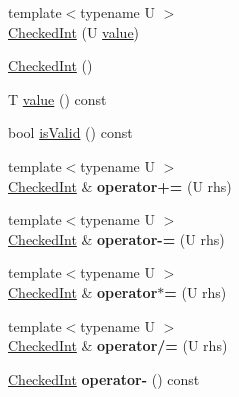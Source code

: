 \begin{DoxyCompactItemize}
\item 
{\footnotesize template$<$typename U $>$ }\\\hyperlink{classmozilla_1_1_checked_int_a5ef492c2db102e1e909e9a0fa2c51e07}{Checked\-Int} (U \hyperlink{classmozilla_1_1_checked_int_a8b36b4a1c385abb43884bcb430fef088}{value})
\item 
\hyperlink{classmozilla_1_1_checked_int_a4335815f498c3974ee7c223b2c6ee653}{Checked\-Int} ()
\item 
T \hyperlink{classmozilla_1_1_checked_int_a8b36b4a1c385abb43884bcb430fef088}{value} () const 
\item 
bool \hyperlink{classmozilla_1_1_checked_int_aa875473e559646998e2cb4f0f54aedc3}{is\-Valid} () const 
\item 
\hypertarget{classmozilla_1_1_checked_int_a36f745b635b95b5b3bb222469b0ef634}{{\footnotesize template$<$typename U $>$ }\\\hyperlink{classmozilla_1_1_checked_int}{Checked\-Int} \& {\bfseries operator+=} (U rhs)}\label{classmozilla_1_1_checked_int_a36f745b635b95b5b3bb222469b0ef634}

\item 
\hypertarget{classmozilla_1_1_checked_int_a6f4c078a17615065226c979bc6e3fd3a}{{\footnotesize template$<$typename U $>$ }\\\hyperlink{classmozilla_1_1_checked_int}{Checked\-Int} \& {\bfseries operator-\/=} (U rhs)}\label{classmozilla_1_1_checked_int_a6f4c078a17615065226c979bc6e3fd3a}

\item 
\hypertarget{classmozilla_1_1_checked_int_a58b43b6cddc26978a9c25f41a1d61a3e}{{\footnotesize template$<$typename U $>$ }\\\hyperlink{classmozilla_1_1_checked_int}{Checked\-Int} \& {\bfseries operator$\ast$=} (U rhs)}\label{classmozilla_1_1_checked_int_a58b43b6cddc26978a9c25f41a1d61a3e}

\item 
\hypertarget{classmozilla_1_1_checked_int_aac2624fd4b61c3b66954f3c7bf45aac1}{{\footnotesize template$<$typename U $>$ }\\\hyperlink{classmozilla_1_1_checked_int}{Checked\-Int} \& {\bfseries operator/=} (U rhs)}\label{classmozilla_1_1_checked_int_aac2624fd4b61c3b66954f3c7bf45aac1}

\item 
\hypertarget{classmozilla_1_1_checked_int_a9113d9f3d9084a45123eaee1ccfc10b9}{\hyperlink{classmozilla_1_1_checked_int}{Checked\-Int} {\bfseries operator-\/} () const }\label{classmozilla_1_1_checked_int_a9113d9f3d9084a45123eaee1ccfc10b9}


\end{DoxyCompactItemize}
